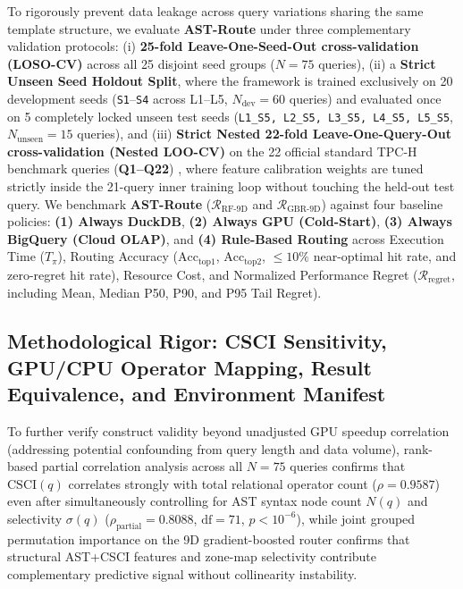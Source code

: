 \documentclass[10pt,a4paper]{article}
\begin{document}
To rigorously prevent data leakage across query variations sharing the same template structure, we evaluate \textbf{AST-Route} under three complementary validation protocols: (i) \textbf{25-fold Leave-One-Seed-Out cross-validation (LOSO-CV)} across all 25 disjoint seed groups ($N=75$ queries), (ii) a \textbf{Strict Unseen Seed Holdout Split}, where the framework is trained exclusively on 20 development seeds (\texttt{S1}--\texttt{S4} across L1--L5, $N_{\text{dev}}=60$ queries) and evaluated once on 5 completely locked unseen test seeds (\texttt{L1\_S5, L2\_S5, L3\_S5, L4\_S5, L5\_S5}, $N_{\text{unseen}}=15$ queries), and (iii) \textbf{Strict Nested 22-fold Leave-One-Query-Out cross-validation (Nested LOO-CV)} on the 22 official standard TPC-H benchmark queries (\textbf{Q1--Q22}) \cite{tpc2022tpch}, where feature calibration weights are tuned strictly inside the 21-query inner training loop without touching the held-out test query. We benchmark \textbf{AST-Route} ($\mathcal{R}_{\text{RF-9D}}$ and $\mathcal{R}_{\text{GBR-9D}}$) against four baseline policies: \textbf{(1) Always DuckDB}, \textbf{(2) Always GPU (Cold-Start)}, \textbf{(3) Always BigQuery (Cloud OLAP)}, and \textbf{(4) Rule-Based Routing} across Execution Time ($T_{\pi}$), Routing Accuracy ($\text{Acc}_{\text{top1}}$, $\text{Acc}_{\text{top2}}$, $\le 10\%$ near-optimal hit rate, and zero-regret hit rate), Resource Cost, and Normalized Performance Regret ($\mathcal{R}_{\text{regret}}$, including Mean, Median P50, P90, and P95 Tail Regret).

\subsection{Methodological Rigor: CSCI Sensitivity, GPU/CPU Operator Mapping, Result Equivalence, and Environment Manifest}
To further verify construct validity beyond unadjusted GPU speedup correlation (addressing potential confounding from query length and data volume), rank-based partial correlation analysis across all $N=75$ queries confirms that $\text{CSCI}(q)$ correlates strongly with total relational operator count ($\rho = 0.9587$) even after simultaneously controlling for AST syntax node count $N(q)$ and selectivity $\sigma(q)$ ($\rho_{\text{partial}} = 0.8088$, $\text{df}=71$, $p < 10^{-6}$), while joint grouped permutation importance on the 9D gradient-boosted router confirms that structural AST+CSCI features and zone-map selectivity contribute complementary predictive signal without collinearity instability.
\end{document}
